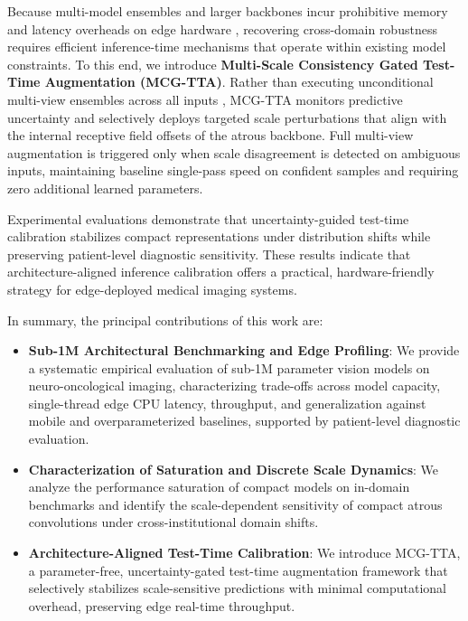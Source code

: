 \documentclass[journal]{IEEEtran}
\begin{document}
Because multi-model ensembles and larger backbones incur prohibitive memory and latency overheads on edge hardware \cite{9, 16}, recovering cross-domain robustness requires efficient inference-time mechanisms that operate within existing model constraints. To this end, we introduce \textbf{Multi-Scale Consistency Gated Test-Time Augmentation (MCG-TTA)}. Rather than executing unconditional multi-view ensembles across all inputs \cite{4, 35}, MCG-TTA monitors predictive uncertainty and selectively deploys targeted scale perturbations that align with the internal receptive field offsets of the atrous backbone. Full multi-view augmentation is triggered only when scale disagreement is detected on ambiguous inputs, maintaining baseline single-pass speed on confident samples and requiring zero additional learned parameters.

Experimental evaluations demonstrate that uncertainty-guided test-time calibration stabilizes compact representations under distribution shifts while preserving patient-level diagnostic sensitivity. These results indicate that architecture-aligned inference calibration offers a practical, hardware-friendly strategy for edge-deployed medical imaging systems.

In summary, the principal contributions of this work are:
\begin{itemize}
\item \textbf{Sub-1M Architectural Benchmarking and Edge Profiling}: We provide a systematic empirical evaluation of sub-1M parameter vision models on neuro-oncological imaging, characterizing trade-offs across model capacity, single-thread edge CPU latency, throughput, and generalization against mobile and overparameterized baselines, supported by patient-level diagnostic evaluation.
\item \textbf{Characterization of Saturation and Discrete Scale Dynamics}: We analyze the performance saturation of compact models on in-domain benchmarks and identify the scale-dependent sensitivity of compact atrous convolutions under cross-institutional domain shifts.
\item \textbf{Architecture-Aligned Test-Time Calibration}: We introduce MCG-TTA, a parameter-free, uncertainty-gated test-time augmentation framework that selectively stabilizes scale-sensitive predictions with minimal computational overhead, preserving edge real-time throughput.
\end{itemize}

\end{document}
